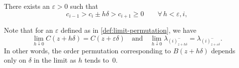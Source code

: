 \begin{definition}
  \label{def:limit-permutation}
  There exists an \(\varepsilon > 0\) such that
  \begin{equation}
    c_{i - 1} > c_i \pm h \delta > c_{i + 1} \geq 0 \qquad \forall\, h < \varepsilon, i,
  \end{equation}
\end{definition}

Note that for an \(\varepsilon\) defined as in \cref{def:limit-permutation}, we have
\begin{equation}
  \lim_{h \downarrow 0} C(z + h\delta) = C(z + \varepsilon \delta)
  \quad\text{and}\quad
  \lim_{h \downarrow 0} \lambda_{(i)^-_{z + h\delta}}
  = \lambda_{(i)^-_{z + \varepsilon\delta}}.
\end{equation}
In other words, the order permutation corresponding to \(B(z + h\delta)\) depends only on
\(\delta\) in the limit as \(h\) tends to~\(0\).

